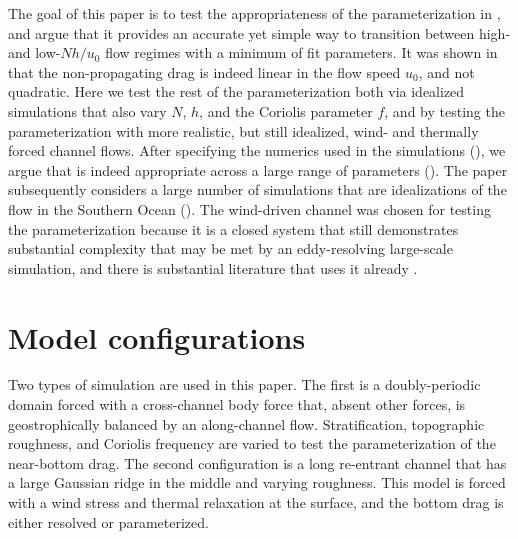 \documentclass[twocol]{ametsocV5}
\begin{document}
The goal of this paper is to test the appropriateness of the parameterization in , and argue that it provides an accurate yet simple way to transition between high- and low-$Nh/u_0$ flow regimes with a minimum of fit parameters.  It was shown in \citet{klymak18} that the non-propagating drag is indeed linear in the flow speed $u_0$, and not quadratic.  Here we test the rest of the parameterization both via idealized simulations that also vary $N$, $h$, and the Coriolis parameter $f$, and by testing the parameterization with more realistic, but still idealized, wind- and thermally forced channel flows.  After specifying the numerics used in the simulations (), we argue that  is indeed appropriate across a large range of parameters ().  The paper subsequently considers a large number of simulations that are idealizations of the flow in the Southern Ocean  ().  The wind-driven channel was chosen for testing the parameterization because it is a closed system that still demonstrates substantial complexity that may be met by an eddy-resolving large-scale simulation, and there is substantial literature that uses it already \citep[i.e.][]{abernatheycessi14,Marshall_2017}.   
 




\section{Model configurations}
\label{sec:Model}

Two types of simulation are used in this paper.  The first is a doubly-periodic domain forced with a cross-channel body force that, absent other forces, is geostrophically balanced by an along-channel flow.  Stratification, topographic roughness, and Coriolis frequency are varied to test the parameterization of the near-bottom drag.  The second configuration is a long re-entrant channel that has a large Gaussian ridge in the middle and varying roughness.  This model is forced with a wind stress and thermal relaxation at the surface, and the bottom drag is either resolved or parameterized.  
\end{document}
